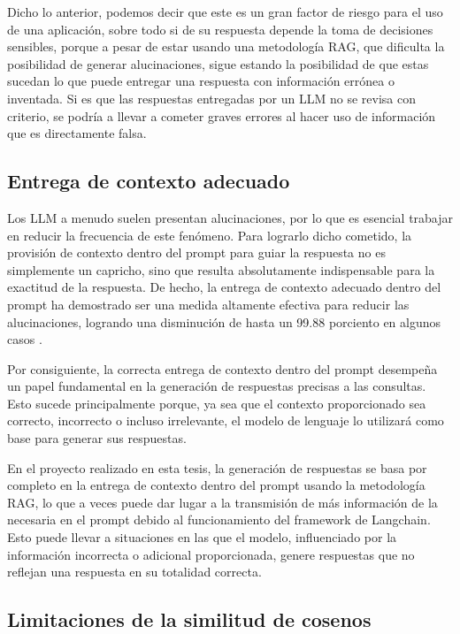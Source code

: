 Dicho lo anterior, podemos decir que este es un gran factor de riesgo para el uso de una aplicación, sobre todo si de su respuesta depende la toma de decisiones sensibles, porque a pesar de estar usando una 
metodología RAG, que dificulta la posibilidad de generar alucinaciones, sigue estando la posibilidad de que estas sucedan lo que puede 
entregar una respuesta con información errónea o inventada. Si es que las respuestas entregadas por un LLM no se revisa con criterio, se podría a llevar a cometer graves errores al hacer uso de información que es directamente falsa.


\subsection{Entrega de contexto adecuado}

Los LLM a menudo suelen presentan alucinaciones, por lo que es esencial trabajar en reducir la frecuencia de este fenómeno. 
Para lograrlo dicho cometido, la provisión de contexto dentro del prompt para guiar la respuesta no es simplemente un capricho, sino que resulta 
absolutamente indispensable para la exactitud de la respuesta. De hecho, la entrega de contexto adecuado dentro del prompt ha demostrado 
ser una medida altamente efectiva para reducir las alucinaciones, logrando una disminución de hasta un 
99.88 porciento en algunos casos \cite{riego1}.

Por consiguiente, la correcta entrega de contexto dentro del prompt desempeña un papel fundamental en 
la generación de respuestas precisas a las consultas. Esto sucede principalmente porque, ya sea que el contexto 
proporcionado sea correcto, incorrecto o incluso irrelevante, el modelo de lenguaje lo utilizará como base 
para generar sus respuestas.

En el proyecto realizado en esta tesis, la generación de respuestas se basa por completo en la entrega de contexto 
dentro del prompt usando la metodología RAG, lo que a veces puede dar lugar a la transmisión de más información de la necesaria en el prompt 
debido al funcionamiento del framework de Langchain. Esto puede llevar a situaciones en las que el modelo, 
influenciado por la información incorrecta o adicional proporcionada, genere respuestas que no reflejan una respuesta en su totalidad correcta.


\subsection{Limitaciones de la similitud de cosenos}

